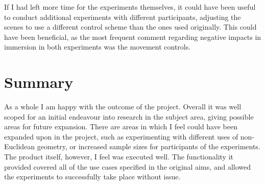 		If I had left more time for the experiments themselves, it could have been useful to conduct additional experiments with different participants, adjusting the scenes to use a different control scheme than the ones used originally.
		This could have been beneficial, as the most frequent comment regarding negative impacts in immersion in both experiments was the movement controls.

	\section{Summary}

		As a whole I am happy with the outcome of the project.
		Overall it was well scoped for an initial endeavour into research in the subject area, giving possible areas for future expansion.
		There are areas in which I feel could have been expanded upon in the project, such as experimenting with different uses of non-Euclidean geometry, or increased sample sizes for participants of the experiments.
		The product itself, however, I feel was executed well.
		The functionality it provided covered all of the use cases specified in the original aims, and allowed the experiments to successfully take place without issue.